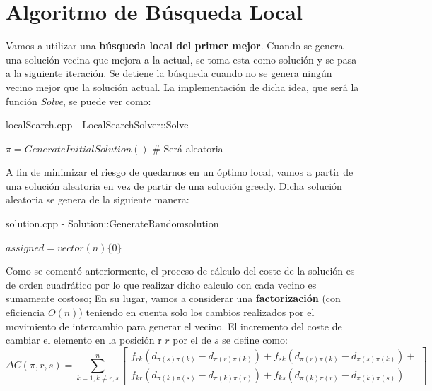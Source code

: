 \documentclass[a4paper, 12pt]{article}
\begin{document}
      
      \newpage
      \section{Algoritmo de Búsqueda Local}
      Vamos a utilizar una \textbf{búsqueda local del primer mejor}. Cuando se genera una solución vecina que mejora a la actual, se toma esta como solución y se pasa a la siguiente iteración. Se detiene la búsqueda cuando no se genera ningún vecino mejor que la solución actual. La implementación de dicha idea, que será la función \textit{Solve}, se puede ver como:
      \begin{algorithm}
		\caption{localSearch.cpp - LocalSearchSolver::Solve}      
      
         $\pi = GenerateInitialSolution()$ \# Será aleatoria\\
      \end{algorithm}
      
      A fin de minimizar el riesgo de quedarnos en un óptimo local, vamos a partir de una solución aleatoria en vez de partir de una solución greedy. Dicha solución aleatoria se genera de la siguiente manera:
      \begin{algorithm}
      	\caption{solution.cpp - Solution::GenerateRandomsolution}
         $assigned = vector(n)\{0\}$\\
      \end{algorithm}
      
      Como se comentó anteriormente, el proceso de cálculo del coste de la solución es de orden cuadrático por lo que realizar dicho calculo con cada vecino es sumamente costoso; En su lugar, vamos a considerar una \textbf{factorización} (con eficiencia $O(n)$) teniendo en cuenta solo los cambios realizados por el movimiento de intercambio para generar el vecino. El incremento del coste de cambiar el elemento en la posición r $r$ por el de $s$ se define como:
      $$
\Delta C(\pi,r,s) = \sum_{k=1, k\neq r,s}^{n}\begin{bmatrix}
f_{rk}(d_{\pi(s)\pi(k)} - d_{\pi(r)\pi(k)}) + f_{sk}(d_{\pi(r)\pi(k)} - d_{\pi(s)\pi(k)}) +\\ 
f_{kr}(d_{\pi(k)\pi(s)} - d_{\pi(k)\pi(r)}) + f_{ks}(d_{\pi(k)\pi(r)} - d_{\pi(k)\pi(s)})
\end{bmatrix} 
      $$
      
\end{document}
